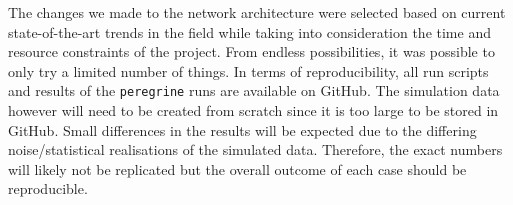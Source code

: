 The changes we made to the network architecture were selected based on current state-of-the-art trends in the field while taking into consideration the time and resource constraints of the project. From endless possibilities, it was possible to only try a limited number of things. In terms of reproducibility, all run scripts and results of the \texttt{peregrine} runs are available on GitHub. The simulation data however will need to be created from scratch since it is too large to be stored in GitHub. Small differences in the results will be expected due to the differing noise/statistical realisations of the simulated data. Therefore, the exact numbers will likely not be replicated but the overall outcome of each case should be reproducible.






